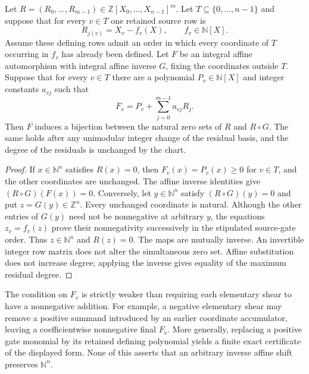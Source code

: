 \begin{lemma}
Let $R=(R_0,\ldots,R_{m-1})\in\mathbb Z[X_0,\ldots,X_{n-1}]^m$.
Let $T\subseteq\{0,\ldots,n-1\}$ and suppose that for every $v\in T$
one retained source row is
\[
 R_{j(v)}=X_v-f_v(X),\qquad f_v\in\mathbb N[X].
\]
Assume these defining rows admit an order in which every coordinate of
$T$ occurring in $f_v$ has already been defined. Let $F$ be an integral
affine automorphism with integral affine inverse $G$, fixing the coordinates
outside $T$. Suppose that for every $v\in T$ there are a polynomial
$P_v\in\mathbb N[X]$ and integer constants $a_{vj}$ such that
\[
 F_v=P_v+\sum_{j=0}^{m-1}a_{vj}R_j.
\]
Then $F$ induces a bijection between the natural zero sets of $R$ and
$R\circ G$. The same holds after any unimodular integer change of the
residual basis, and the degree of the residuals is unchanged by the chart.
\end{lemma}
\begin{proof}
If $x\in\mathbb N^n$ satisfies $R(x)=0$, then
$F_v(x)=P_v(x)\ge0$ for $v\in T$, and the other coordinates are unchanged.
The affine inverse identities give $(R\circ G)(F(x))=0$.
Conversely, let $y\in\mathbb N^n$ satisfy $(R\circ G)(y)=0$ and put
$z=G(y)\in\mathbb Z^n$. Every unchanged coordinate is natural.
Although the other entries of $G(y)$ need not be nonnegative at arbitrary
$y$, the equations $z_v=f_v(z)$ prove their nonnegativity successively in
the stipulated source-gate order. Thus $z\in\mathbb N^n$ and $R(z)=0$.
The maps are mutually inverse. An invertible integer row matrix does not
alter the simultaneous zero set. Affine substitution does not increase
degree; applying the inverse gives equality of the maximum residual degree.
\end{proof}

The condition on $F_v$ is strictly weaker than requiring each elementary
shear to have a nonnegative addition. For example, a negative elementary
shear may remove a positive summand introduced by an earlier coordinate
accumulator, leaving a coefficientwise nonnegative final $F_v$.
More generally, replacing a positive gate monomial by its retained defining
polynomial yields a finite exact certificate of the displayed form. None
of this asserts that an arbitrary inverse affine shift preserves
$\mathbb N^n$.
